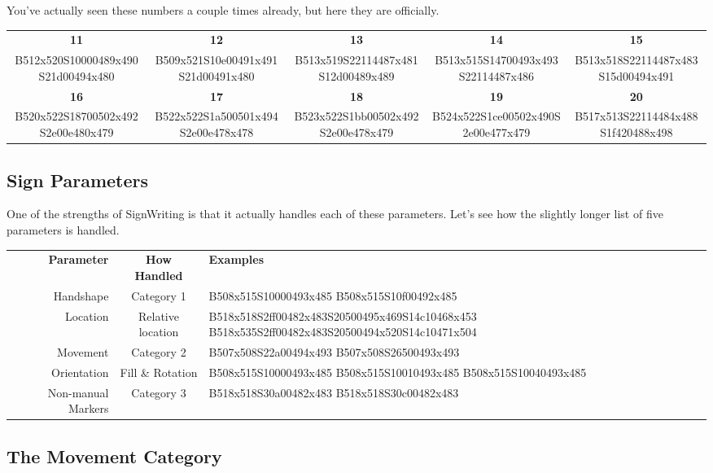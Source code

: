 \documentclass{article}
\begin{document}
You've actually seen these numbers a couple times already, but here they are officially.

\begin{center}
\begin{tabular}{*{5}{c}}
\textbf{11}&\textbf{12}&\textbf{13}&\textbf{14}&\textbf{15}\\
B512x520S10000489x490S21d00494x480&
B509x521S10e00491x491S21d00491x480&
B513x519S22114487x481S12d00489x489&
B513x515S14700493x493S22114487x486&
B513x518S22114487x483S15d00494x491\\
\textbf{16}&\textbf{17}&\textbf{18}&\textbf{19}&\textbf{20}\\
B520x522S18700502x492S2e00e480x479&
B522x522S1a500501x494S2e00e478x478&
B523x522S1bb00502x492S2e00e478x479&
B524x522S1ce00502x490S2e00e477x479&
B517x513S22114484x488S1f420488x498\\
\end{tabular}
\end{center}

\subsection{Sign Parameters}

One of the strengths of SignWriting is that it actually handles each of these parameters.
Let's see how the slightly longer list of five parameters is handled.

\begin{center}
\begin{tabular}{rcl}
\textbf{Parameter}&\textbf{How Handled}&\textbf{Examples}\\
Handshape         &Category 1       &B508x515S10000493x485 B508x515S10f00492x485\\
Location          &Relative location&B518x518S2ff00482x483S20500495x469S14c10468x453 B518x535S2ff00482x483S20500494x520S14c10471x504\\
Movement          &Category 2       &B507x508S22a00494x493 B507x508S26500493x493\\
Orientation       &Fill \& Rotation &B508x515S10000493x485 B508x515S10010493x485 B508x515S10040493x485\\
Non-manual Markers&Category 3       &B518x518S30a00482x483 B518x518S30c00482x483\\
\end{tabular}
\end{center}

\subsection{The Movement Category}
\end{document}
